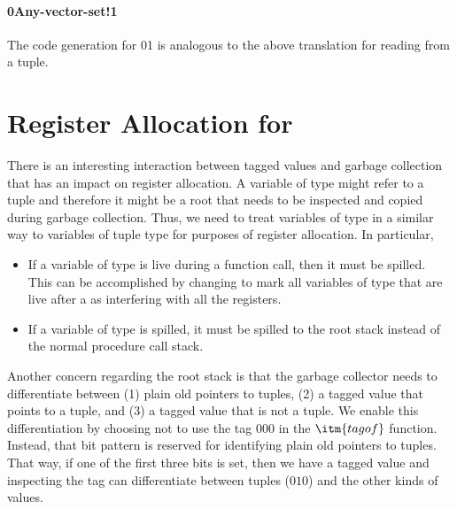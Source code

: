 \documentclass[7x10,nocrop]{TimesAPriori_MIT}%
\def\racketEd{0}
\def\pythonEd{1}
\def\edition{0}
\newcommand{\racket}[1]{{\if\edition\racketEd{#1}\fi}}
\newcommand{\python}[1]{{\if\edition\pythonEd #1\fi}}
\newtheorem{exercise}[theorem]{Exercise}
\begin{document}
\paragraph{\racket{Any-vector-set!}\python{}}

The code generation for
\racket{}\python{} is
analogous to the above translation for reading from a tuple.


\section{Register Allocation for \LangAny{}}
\label{sec:register-allocation-Rany}

There is an interesting interaction between tagged values and garbage
collection that has an impact on register allocation.  A variable of
type \ANYTY{} might refer to a tuple and therefore it might be a root
that needs to be inspected and copied during garbage collection. Thus,
we need to treat variables of type \ANYTY{} in a similar way to
variables of tuple type for purposes of register allocation.  In
particular,
\begin{itemize}
\item If a variable of type \ANYTY{} is live during a function call,
  then it must be spilled. This can be accomplished by changing
   to mark all variables of type \ANYTY{}
  that are live after a  as interfering with all the
  registers.

\item If a variable of type \ANYTY{} is spilled, it must be spilled to
  the root stack instead of the normal procedure call stack.
\end{itemize}

Another concern regarding the root stack is that the garbage collector
needs to differentiate between (1) plain old pointers to tuples, (2) a
tagged value that points to a tuple, and (3) a tagged value that is
not a tuple. We enable this differentiation by choosing not to use the
tag $000$ in the $\itm{tagof}$ function. Instead, that bit pattern is
reserved for identifying plain old pointers to tuples. That way, if
one of the first three bits is set, then we have a tagged value and
inspecting the tag can differentiate between tuples ($010$) and the
other kinds of values.

\end{document}
